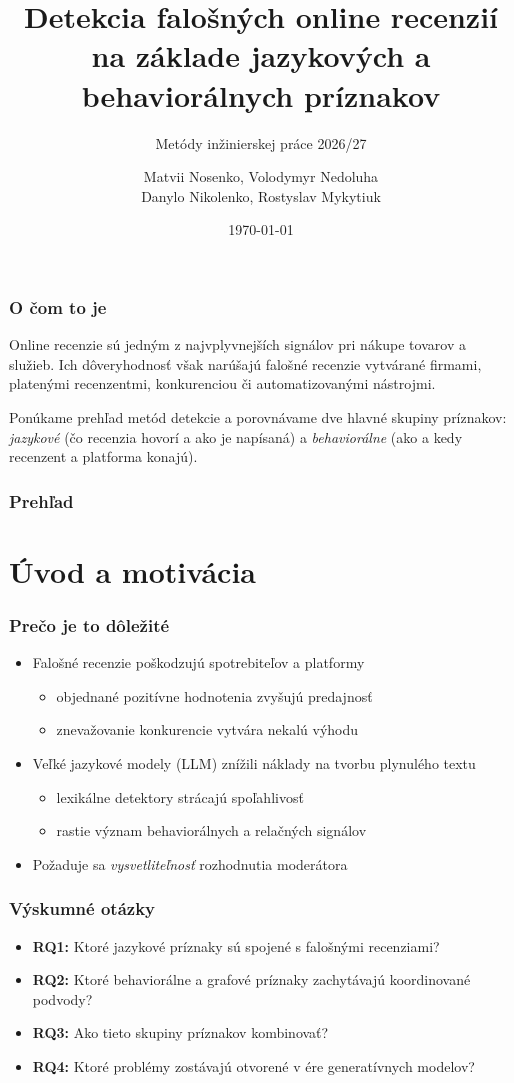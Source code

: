 \documentclass{beamer}
\title[Detekcia falošných recenzií]{Detekcia falošných online recenzií na základe jazykových a behaviorálnych príznakov}
\subtitle{\vspace{2mm}Metódy inžinierskej práce 2026/27}
\author[Matvii Nosenko a kol.]{Matvii Nosenko, Volodymyr Nedoluha\\[1mm]Danylo Nikolenko, Rostyslav Mykytiuk}
\institute[FIIT STU]{%
	Fakulta informatiky a informačných technológií\\
	Slovenská technická univerzita v Bratislave}
\date{\footnotesize \today}
\newcommand{\emp}[1]{\textit{\alert{#1}}}
\begin{document}
\begin{frame}[fragile=singleslide]
\titlepage
\end{frame}

\begin{frame}[fragile=singleslide]\frametitle{O čom to je}
Online recenzie sú jedným z najvplyvnejších signálov pri nákupe tovarov
a služieb. Ich dôveryhodnosť však narúšajú falošné recenzie vytvárané
firmami, platenými recenzentmi, konkurenciou či automatizovanými nástrojmi.

Ponúkame prehľad metód detekcie a porovnávame dve hlavné skupiny príznakov:
\emph{jazykové} (čo recenzia hovorí a ako je napísaná) a \emph{behaviorálne}
(ako a kedy recenzent a platforma konajú).
\end{frame}

\begin{frame}[fragile=singleslide]\frametitle{Prehľad}
\tableofcontents
\end{frame}


\section{Úvod a motivácia}

\begin{frame}[fragile=singleslide]\frametitle{Prečo je to dôležité}
\begin{itemize}
\item Falošné recenzie poškodzujú spotrebiteľov a platformy
	\begin{itemize}
	\item objednané pozitívne hodnotenia zvyšujú predajnosť
	\item znevažovanie konkurencie vytvára nekalú výhodu
	\end{itemize}
\item Veľké jazykové modely (LLM) znížili náklady na tvorbu plynulého textu
	\begin{itemize}
	\item lexikálne detektory strácajú spoľahlivosť
	\item rastie význam behaviorálnych a relačných signálov
	\end{itemize}
\item Požaduje sa \emp{vysvetliteľnosť} rozhodnutia moderátora
\end{itemize}
\end{frame}

\begin{frame}[fragile=singleslide]\frametitle{Výskumné otázky}
\begin{itemize}
\item \textbf{RQ1:} Ktoré jazykové príznaky sú spojené s falošnými recenziami?
\item \textbf{RQ2:} Ktoré behaviorálne a grafové príznaky zachytávajú koordinované podvody?
\item \textbf{RQ3:} Ako tieto skupiny príznakov kombinovať?
\item \textbf{RQ4:} Ktoré problémy zostávajú otvorené v ére generatívnych modelov?
\end{itemize}
\end{frame}
\end{document}
